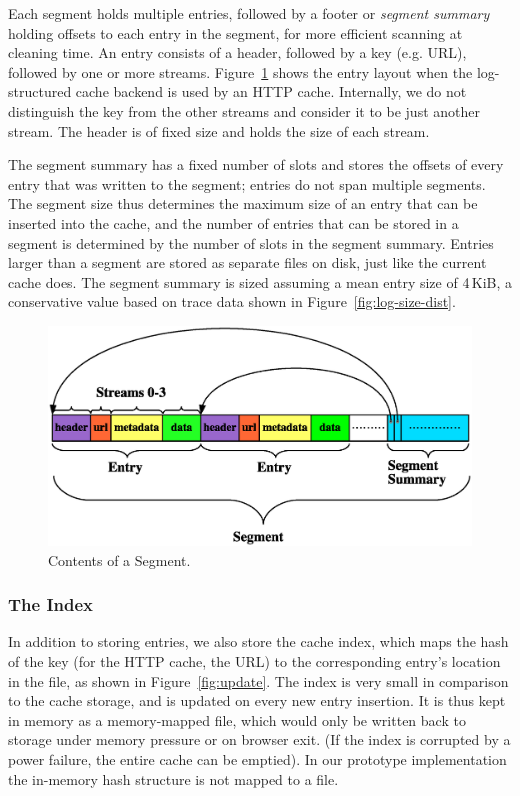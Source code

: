 \documentclass[letterpaper,twocolumn,10pt]{article}
\begin{document}
Each segment holds multiple entries, followed by a footer or \emph{segment
  summary} holding offsets to each entry in the segment, for more efficient
scanning at cleaning time.  An entry consists of a header, followed by a key
(e.g. URL), followed by one or more streams. Figure~\ref{fig:segment} shows the
entry layout when the log-structured cache backend is used by an HTTP cache.
Internally, we do not distinguish the key from the other streams and consider it
to be just another stream.  The header is of fixed size and holds the size of
each stream.

The segment summary has a fixed number of slots and stores the offsets of every
entry that was written to the segment; entries do not span multiple segments.
The segment size thus determines the maximum size of an entry that can be
inserted into the cache, and the number of entries that can be stored in a
segment is determined by the number of slots in the segment summary.  Entries
larger than a segment are stored as separate files on disk, just like the
current cache does.  The segment summary is sized assuming a mean entry size of
4\,KiB, a conservative value based on trace data shown in Figure~\ref{fig:log-size-dist}.

\begin{figure}[t]
  \begin{center}
    \includegraphics[width=\columnwidth]{graphs/segment}
  \end{center}
  \caption{Contents of a Segment.}
  \label{fig:segment} 
\end{figure}

\subsubsection{The Index}
In addition to storing entries, we also store the cache index, which maps the
hash of the key (for the HTTP cache, the URL) to the corresponding entry's
location in the file, as shown in Figure~\ref{fig:update}.  The index is very
small in comparison to the cache storage, and is updated on every new entry
insertion.  It is thus kept in memory as a memory-mapped file, which would only
be written back to storage under memory pressure or on browser exit. (If the
index is corrupted by a power failure, the entire cache can be emptied).  In our
prototype implementation the in-memory hash structure is not mapped to a file.
\end{document}
